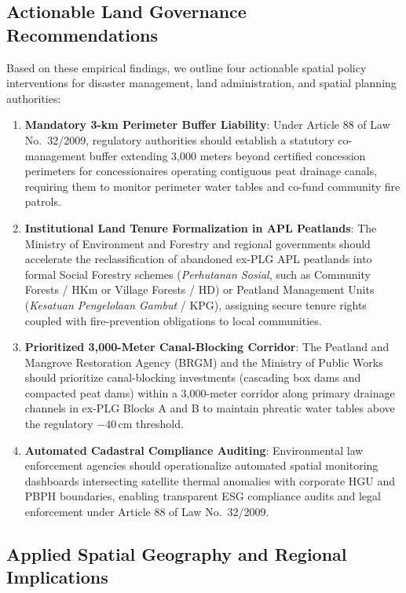 \subsection{Actionable Land Governance Recommendations}
\label{subsec:concl_policy}

Based on these empirical findings, we outline four actionable spatial policy interventions for disaster management, land administration, and spatial planning authorities:
\begin{enumerate}
    \item \textbf{Mandatory 3-km Perimeter Buffer Liability}: Under Article 88 of Law No.~32/2009, regulatory authorities should establish a statutory co-management buffer extending 3,000 meters beyond certified concession perimeters for concessionaires operating contiguous peat drainage canals, requiring them to monitor perimeter water tables and co-fund community fire patrols.
    \item \textbf{Institutional Land Tenure Formalization in APL Peatlands}: The Ministry of Environment and Forestry and regional governments should accelerate the reclassification of abandoned ex-PLG APL peatlands into formal Social Forestry schemes (\textit{Perhutanan Sosial}, such as Community Forests / HKm or Village Forests / HD) or Peatland Management Units (\textit{Kesatuan Pengelolaan Gambut} / KPG), assigning secure tenure rights coupled with fire-prevention obligations to local communities.
    \item \textbf{Prioritized 3,000-Meter Canal-Blocking Corridor}: The Peatland and Mangrove Restoration Agency (BRGM) and the Ministry of Public Works should prioritize canal-blocking investments (cascading box dams and compacted peat dams) within a 3,000-meter corridor along primary drainage channels in ex-PLG Blocks A and B to maintain phreatic water tables above the regulatory $-40$\,cm threshold.
    \item \textbf{Automated Cadastral Compliance Auditing}: Environmental law enforcement agencies should operationalize automated spatial monitoring dashboards intersecting satellite thermal anomalies with corporate HGU and PBPH boundaries, enabling transparent ESG compliance audits and legal enforcement under Article 88 of Law No.~32/2009.
\end{enumerate}

\subsection{Applied Spatial Geography and Regional Implications}
\label{subsec:concl_future}

